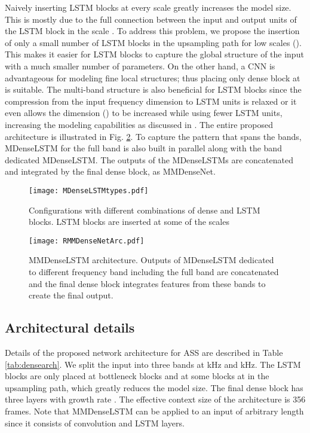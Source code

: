 \documentclass{article}
\begin{document}
Naively inserting LSTM blocks at every scale greatly increases the model size. This is mostly due to the full connection between the input and output units of the LSTM block in the scale . To address this problem, we propose the insertion of only a small number of LSTM blocks in the upsampling path for low scales (). This makes it easier for LSTM blocks to capture the global structure of the input with a much smaller number of parameters. On the other hand, a CNN is advantageous for modeling fine local structures; thus placing only dense block at  is suitable.
The multi-band structure is also beneficial for LSTM blocks since the compression from the input frequency dimension  to  LSTM units is relaxed or it even allows the dimension () to be increased while using fewer LSTM units, increasing the modeling capabilities as discussed in \cite{Zagoruyko16}. 
The entire proposed architecture is illustrated in Fig. \ref{fig:rmmdense}.
To capture the pattern that spans the bands, MDenseLSTM for the full band is also built in parallel along with the band dedicated MDenseLSTM. The outputs of the MDenseLSTMs are concatenated and integrated by the final dense block, as MMDenseNet.
\label{sec:MMDenseNet}
\begin{figure}[t]
\centering
\texttt{[image: MDenseLSTMtypes.pdf]}
\caption{Configurations with different combinations of dense and LSTM blocks. LSTM blocks are inserted at some of the scales}
\label{fig:rmdensetypes}
\end{figure}
\begin{figure}[t]
\centering
\texttt{[image: RMMDenseNetArc.pdf]}
\caption{MMDenseLSTM architecture. Outputs of MDenseLSTM dedicated to different frequency band including the full band are concatenated and the final dense block integrates features from these bands to create the final output.}
\label{fig:rmmdense}
\end{figure}

\subsection{Architectural details}
\label{sec:detailArch}
Details of the proposed network architecture for ASS are described in Table \ref{tab:densearch}. We split the input into three bands at kHz and kHz. The LSTM blocks are only placed at bottleneck blocks and at some blocks at  in the upsampling path, which greatly reduces the model size. The final dense block has three layers with growth rate . The effective context size of the architecture is 356 frames. Note that MMDenseLSTM can be applied to an input of arbitrary length since it consists of convolution and LSTM layers.
\end{document}
